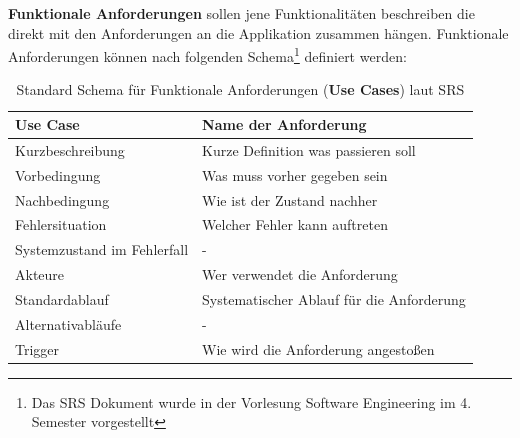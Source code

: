 	\textbf{Funktionale Anforderungen }sollen jene Funktionalitäten beschreiben die direkt mit den Anforderungen an die Applikation zusammen hängen. Funktionale Anforderungen können nach folgenden Schema\footnote{Das SRS Dokument wurde in der Vorlesung Software Engineering im 4. Semester vorgestellt} definiert werden:
	\begin{table}[h]
		\centering
		\begin{tabular}{ll}
			Use Case                    &  Name der Anforderung\\ \hline
			Kurzbeschreibung            &  Kurze Definition was passieren soll\\ \hline
			Vorbedingung                &  Was muss vorher gegeben sein\\ \hline
			Nachbedingung               &  Wie ist der Zustand nachher\\ \hline
			Fehlersituation             &  Welcher Fehler kann auftreten\\ \hline
			Systemzustand im Fehlerfall &  - \\ \hline
			Akteure                     &  Wer verwendet die Anforderung\\ \hline
			Standardablauf              &  Systematischer Ablauf für die Anforderung\\ \hline
			Alternativabläufe           &  - \\ \hline
			Trigger                     &  Wie wird die Anforderung angestoßen
		\end{tabular}
		\caption{Standard Schema für Funktionale Anforderungen (\textbf{Use Cases}) laut SRS}
		\label{my-label}
	\end{table}

